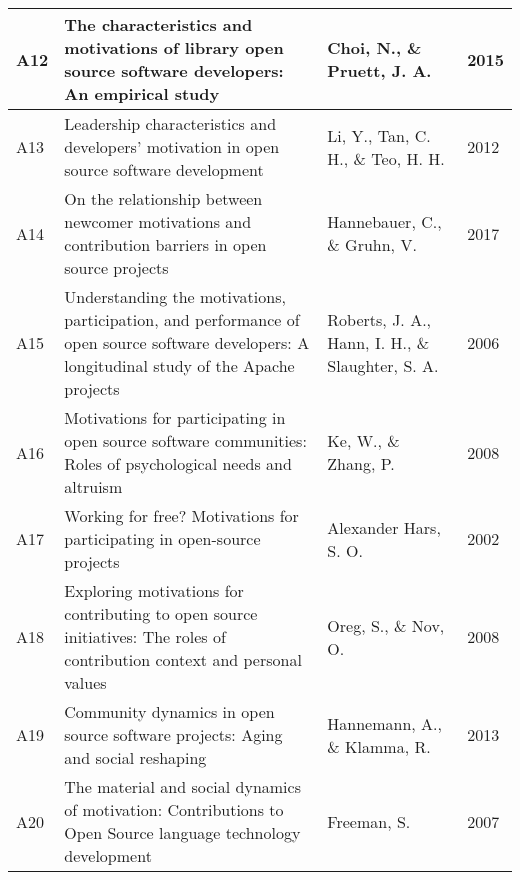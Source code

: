 \begin{landscape}
\begin{center}
\begin{longtable}{ | m{5em} | m{25em}| m{22em} | m{4em} | }
A12           & The characteristics and motivations of library open source software developers: An empirical study    & Choi, N., \& Pruett, J. A.                                     & 2015                \\ \hline
A13           & Leadership characteristics and developers' motivation in open source software development               & Li, Y., Tan, C. H., \& Teo, H. H.                             & 2012                \\ \hline
A14           & On the relationship between newcomer motivations and contribution barriers in open source projects & Hannebauer, C., \& Gruhn, V. & 2017 \\ \hline
A15           & Understanding the motivations, participation, and performance of open source software developers: A longitudinal study of the Apache projects & Roberts, J. A., Hann, I. H., \& Slaughter, S. A. & 2006 \\ \hline
A16           & Motivations for participating in open source software communities: Roles of psychological needs and altruism & Ke, W., \& Zhang, P. & 2008 \\ \hline
A17           & Working for free? Motivations for participating in open-source projects & Alexander Hars, S. O. & 2002 \\ \hline
A18           & Exploring motivations for contributing to open source initiatives: The roles of contribution context and personal values & Oreg, S., \& Nov, O. & 2008 \\ \hline

A19           & Community dynamics in open source software projects: Aging and social reshaping & Hannemann, A., \& Klamma, R. & 2013 \\ \hline

A20           & The material and social dynamics of motivation: Contributions to Open Source language technology development & Freeman, S. & 2007 \\ \hline



\end{longtable}
\end{center}
\end{landscape}

\clearpage %